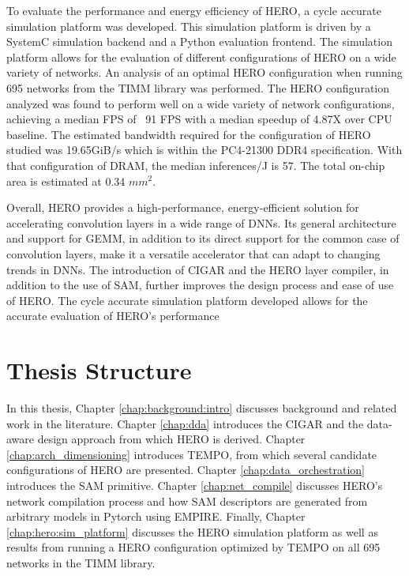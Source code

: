 To evaluate the performance and energy efficiency of HERO, a cycle accurate
simulation platform was developed. This simulation platform is driven by a
SystemC simulation backend and a Python evaluation frontend. The simulation
platform allows for the evaluation of different configurations of HERO on a wide
variety of networks. An analysis of an optimal HERO configuration when running
695 networks from the TIMM library was performed. The HERO configuration
analyzed was found to perform well on a wide variety of network configurations,
achieving a median FPS of ~91 FPS with a median speedup of 4.87X over CPU
baseline. The estimated bandwidth required for the configuration of HERO studied
was 19.65GiB/s which is within the PC4-21300 DDR4 specification. With that
configuration of DRAM, the median inferences/J is 57. The total on-chip area is
estimated at 0.34 $mm^2$.


Overall, HERO provides a high-performance, energy-efficient solution for
accelerating convolution layers in a wide range of DNNs. Its general
architecture and support for GEMM, in addition to its direct support for the
common case of convolution layers, make it a versatile accelerator that can
adapt to changing trends in DNNs. The introduction of CIGAR and the HERO layer
compiler, in addition to the use of SAM, further improves the design process and
ease of use of HERO. The cycle accurate simulation platform developed allows for
the accurate evaluation of HERO's performance


\section{Thesis Structure}
\label{chap:intro:thesis_structure}


In this thesis, Chapter \ref{chap:background:intro} discusses background and
related work in the literature. Chapter \ref{chap:dda} introduces the CIGAR and
the data-aware design approach from which HERO is derived. Chapter
\ref{chap:arch_dimensioning} introduces TEMPO, from which several candidate
configurations of HERO are presented. Chapter \ref{chap:data_orchestration}
introduces the SAM primitive. Chapter \ref{chap:net_compile} discusses HERO's
network compilation process and how SAM descriptors are generated from arbitrary
models in Pytorch using EMPIRE. Finally, Chapter \ref{chap:hero:sim_platform}
discusses the HERO simulation platform as well as results from running a HERO
configuration optimized by TEMPO on all 695 networks in the TIMM library.